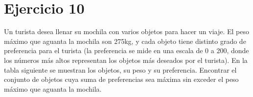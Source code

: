 \documentclass[11pt, spanish]{article}
\begin{document}










\section{Ejercicio 10}

Un turista desea llenar su mochila con varios objetos para hacer un viaje. El peso máximo que aguanta la mochila son 275kg, y cada objeto tiene distinto grado de preferencia para el turista (la preferencia se mide en una escala de 0 a 200, donde los números más altos representan los objetos más deseados por el turista). En la tabla siguiente se muestran los objetos, su peso y su preferencia. Encontrar el conjunto de objetos cuya suma de preferencias sea máxima sin exceder el peso máximo que aguanta la mochila.
\end{document}
